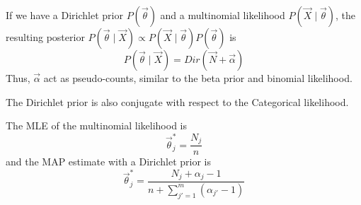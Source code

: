 If we have a Dirichlet prior $P(\vec{\theta})$
and a multinomial likelihood $P(\vec{X} \mid \vec{\theta})$,
the resulting posterior $P(\vec{\theta} \mid \vec{X}) \propto P(\vec{X} \mid \vec{\theta}) P(\vec{\theta})$
is
\begin{equation*}
    P(\vec{\theta} \mid \vec{X}) = Dir(\vec{N} + \vec{\alpha})
\end{equation*}
Thus, $\vec{\alpha}$ act as pseudo-counts,
similar to the beta prior and binomial likelihood.

The Dirichlet prior is also conjugate with respect
to the Categorical likelihood.

The MLE of the multinomial likelihood is
\begin{equation*}
    \vec{\theta}_j^* = \frac{N_j}{n}
\end{equation*}
and the MAP estimate with a Dirichlet prior is
\begin{equation*}
    \vec{\theta}_j^* = \frac{N_j + \alpha_j - 1}{n + \sum_{j' = 1}^m{(\alpha_{j'} - 1)}}
\end{equation*}
